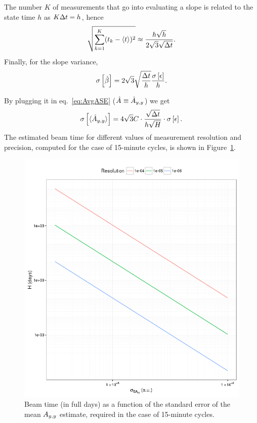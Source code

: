 \documentclass{article}
\begin{document}
The number $K$ of measurements that go into evaluating a slope is related to the state time $h$ as $K\Delta t = h$, hence
\[
	\sqrt{\sum_{k=1}^K (t_k - \langle t\rangle)^2} \approx \frac{h\sqrt{h}}{2\sqrt{3}\sqrt{\Delta t}}.
\]
Finally, for the slope variance,
\begin{equation}\label{eq:SlpVar}
	\SE{\slp*} = 2\sqrt{3}\sqrt{\frac{\Delta t}{h}}\frac{\SE{\err}}{h}.
\end{equation}

By plugging it in eq.~\eqref{eq:AvgASE} ($\A* \equiv \Ayy*$) we get
\begin{equation}\label{eq:AvgAyySEPhys}
\SE{\avg{\Ayy*}} = 4\sqrt{3}C\cdot \frac{\sqrt{\Tint}}{h\sqrt{H}}\cdot\SE{\err}.
\end{equation}
The estimated beam time for different values of measurement resolution and precision, computed for the case of 15-minute cycles, is shown in Figure~\ref{fig:BeamTime}.

\begin{figure}[h]
\centering
\includegraphics[scale=1]{BeamTime_15minCycles}
\caption{Beam time (in full days) as a function of the standard error of the mean $\Ayy$ estimate, required in the case of 15-minute cycles.\label{fig:BeamTime}}
\end{figure}
\end{document}
